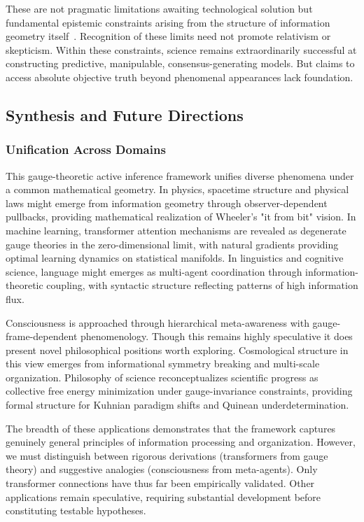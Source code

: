 \documentclass[11pt]{article}
\begin{document}
These are not pragmatic limitations awaiting technological solution but fundamental epistemic constraints arising from the structure of information geometry itself~\cite{Ladyman2007}. Recognition of these limits need not promote relativism or skepticism. Within these constraints, science remains extraordinarily successful at constructing predictive, manipulable, consensus-generating models. But claims to access absolute objective truth beyond phenomenal appearances lack foundation.

\subsection{Synthesis and Future Directions}

\subsubsection{Unification Across Domains}

This gauge-theoretic active inference framework unifies diverse phenomena under a common mathematical geometry. In physics, spacetime structure and physical laws might emerge from information geometry through observer-dependent pullbacks, providing mathematical realization of Wheeler's "it from bit" vision. In machine learning, transformer attention mechanisms are revealed as degenerate gauge theories in the zero-dimensional limit, with natural gradients providing optimal learning dynamics on statistical manifolds. In linguistics and cognitive science, language might emerges as multi-agent coordination through information-theoretic coupling, with syntactic structure reflecting patterns of high information flux.

Consciousness is approached through hierarchical meta-awareness with gauge-frame-dependent phenomenology. Though this remains highly speculative it does present novel philosophical positions worth exploring. Cosmological structure in this view emerges from informational symmetry breaking and multi-scale organization. Philosophy of science reconceptualizes scientific progress as collective free energy minimization under gauge-invariance constraints, providing formal structure for Kuhnian paradigm shifts and Quinean underdetermination.

The breadth of these applications demonstrates that the framework captures genuinely general principles of information processing and organization. However, we must distinguish between rigorous derivations (transformers from gauge theory) and suggestive analogies (consciousness from meta-agents). Only transformer connections have thus far been empirically validated. Other applications remain speculative, requiring substantial development before constituting testable hypotheses.
\end{document}

